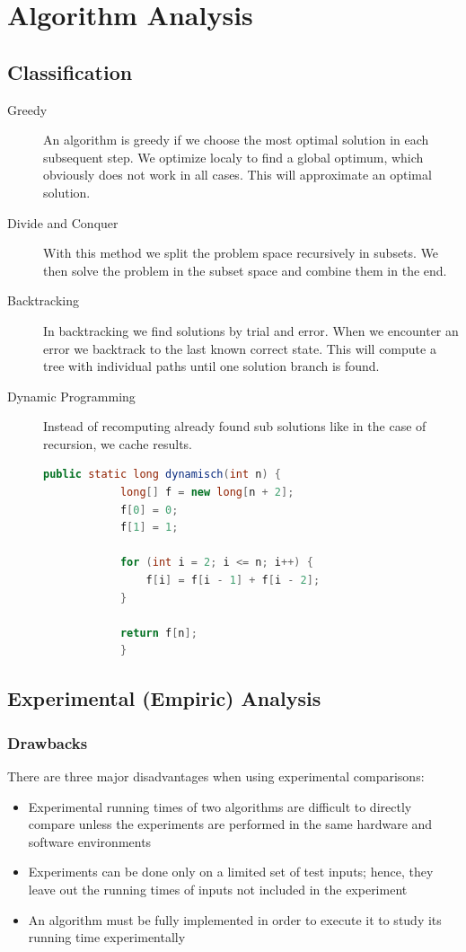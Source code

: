 \documentclass[../Main.tex]{subfiles}
\begin{document}
\chapter{Algorithm Analysis}

\intro{

}

\section{Classification}
\begin{description}
    \item[Greedy] An algorithm is greedy if we choose the most optimal solution in each subsequent step.
    We optimize localy to find a global optimum, which obviously does not work in all cases.
    This will approximate an optimal solution.
    \item[Divide and Conquer] With this method we split the problem space recursively in subsets.
    We then solve the problem in the subset space and combine them in the end.
    \item[Backtracking] In backtracking we find solutions by trial and error.
    When we encounter an error we backtrack to the last known correct state.
    This will compute a tree with individual paths until one solution branch is found.
    \item[Dynamic Programming] Instead of recomputing already found sub solutions like in the case of
    recursion, we cache results.
    \begin{lstlisting}[language=Java, caption=Dynamic Fib]
        public static long dynamisch(int n) {
            long[] f = new long[n + 2];
            f[0] = 0;
            f[1] = 1;

            for (int i = 2; i <= n; i++) {
                f[i] = f[i - 1] + f[i - 2];
            }

            return f[n];
            }
    \end{lstlisting}
\end{description}

\section{Experimental (Empiric) Analysis}
\subsection{Drawbacks}
There are three major disadvantages when using experimental comparisons:
\begin{itemize}
    \item Experimental running times of two algorithms are difficult to directly compare unless the experiments are performed in the same hardware and software environments
    \item Experiments can be done only on a limited set of test inputs; hence, they leave out the running times of inputs not included in the experiment
    \item An algorithm must be fully implemented in order to execute it to study its running time experimentally
\end{itemize}
\end{document}
